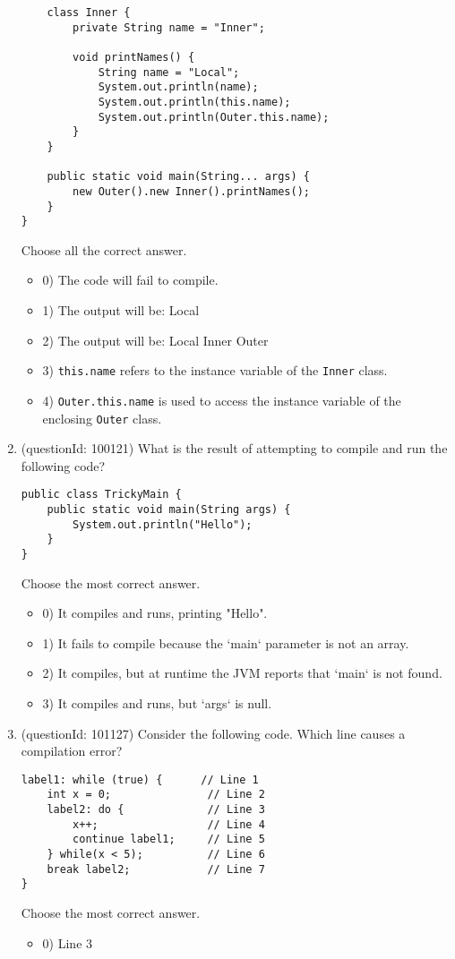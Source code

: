 \documentclass[12pt]{article}
\begin{document}
\begin{enumerate}[label=(\arabic*)]
\begin{verbatim}
    class Inner {
        private String name = "Inner";

        void printNames() {
            String name = "Local";
            System.out.println(name);
            System.out.println(this.name);
            System.out.println(Outer.this.name);
        }
    }

    public static void main(String... args) {
        new Outer().new Inner().printNames();
    }
}
\end{verbatim}
Choose all the correct answer.\begin{itemize}
\item 0) The code will fail to compile.

\item 1) The output will be: Local

\item 2) The output will be: Local Inner Outer

\item 3) \verb|this.name| refers to the instance variable of the \verb|Inner| class.

\item 4) \verb|Outer.this.name| is used to access the instance variable of the enclosing \verb|Outer| class.

\end{itemize}
\item (questionId: 100121) What is the result of attempting to compile and run the following code?
\begin{verbatim}
public class TrickyMain {
    public static void main(String args) {
        System.out.println("Hello");
    }
}
\end{verbatim}
Choose the most correct answer. 
\begin{itemize}
\item 0) It compiles and runs, printing "Hello".

\item 1) It fails to compile because the `main` parameter is not an array.

\item 2) It compiles, but at runtime the JVM reports that `main` is not found.

\item 3) It compiles and runs, but `args` is null.

\end{itemize}
\item (questionId: 101127) Consider the following code. Which line causes a compilation error?\n\begin{verbatim}
label1: while (true) {      // Line 1
    int x = 0;               // Line 2
    label2: do {             // Line 3
        x++;                 // Line 4
        continue label1;     // Line 5
    } while(x < 5);          // Line 6
    break label2;            // Line 7
}
\end{verbatim}
Choose the most correct answer. 
\begin{itemize}
\item 0) Line 3


\end{itemize}
\end{enumerate}
\end{document}
